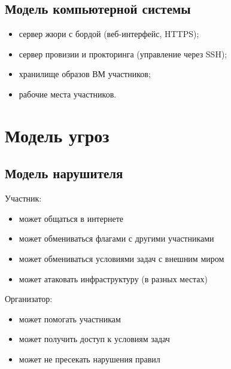 \subsection{Модель компьютерной системы}

\begin{itemize}
\item
  сервер жюри с бордой (веб-интерфейс, HTTPS);
\item
  сервер провизии и прокторинга (управление через SSH);
\item
  хранилище образов ВМ участников;
\item
  рабочие места участников.
\end{itemize}

\section{Модель угроз}

\subsection{Модель нарушителя}

Участник:
\begin{itemize}
\item
  может общаться в интернете
\item
  может обмениваться флагами с другими участниками
\item
  может обмениваться условиями задач с внешним миром
\item
  может атаковать инфраструктуру (в разных местах)
\end{itemize}

Организатор:
\begin{itemize}
\item может помогать участникам
\item может получить доступ к условиям задач
\item может не пресекать нарушения правил
\end{itemize}
